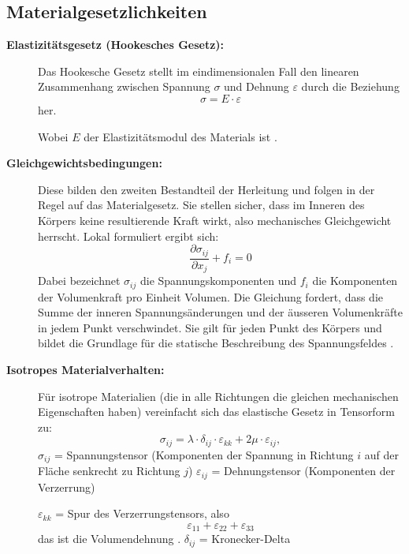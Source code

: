 \subsection{Materialgesetzlichkeiten}
\begin{description}	
	\item[\textbf{Elastizitätsgesetz (Hookesches Gesetz):}] Das Hookesche Gesetz stellt im eindimensionalen Fall den linearen Zusammenhang zwischen Spannung $\sigma$ und Dehnung $\varepsilon$ durch die Beziehung 
	\begin{equation}
		\sigma = 
		E \cdot \varepsilon
	\end{equation}
	 her.
	 
	 Wobei $E$ der Elastizitätsmodul des Materials ist \cite{elastomechanik:Kontinuumsmechanik}.
	 \item[\textbf{Gleichgewichtsbedingungen:}] Diese bilden den zweiten Bestandteil der Herleitung und folgen in der Regel auf das Materialgesetz. 
	 Sie stellen sicher, dass im Inneren des Körpers keine resultierende Kraft wirkt, also mechanisches Gleichgewicht herrscht.
	 Lokal formuliert ergibt sich:
	 \begin{equation}
	 	\frac{\partial \sigma_{ij}}{\partial x_j} + f_i =
	 	0
	 \end{equation}
	 Dabei bezeichnet $\sigma_{ij}$ die Spannungskomponenten und $f_i$ die Komponenten der Volumenkraft pro Einheit Volumen. 
	 Die Gleichung fordert, dass die Summe der inneren Spannungsänderungen und der äusseren Volumenkräfte in jedem Punkt verschwindet. Sie gilt für jeden Punkt des Körpers und bildet die Grundlage für die statische Beschreibung des Spannungsfeldes \cite{elastomechanik:Grundlagen der Elastizitaetstheorie}.
	 \item[\textbf{Isotropes Materialverhalten:}] Für isotrope Materialien (die in alle Richtungen die gleichen mechanischen Eigenschaften haben) vereinfacht sich das elastische Gesetz in Tensorform zu:
	 \begin{equation}
	 	\sigma_{ij} = 
	 	\lambda \cdot \delta_{ij} \cdot \varepsilon_{kk} + 2\mu \cdot \varepsilon_{ij},
	 \end{equation}
	$\sigma_{ij}$ = Spannungstensor (Komponenten der Spannung in Richtung $i$ auf der Fläche senkrecht zu Richtung $j$)
	$\varepsilon_{ij}$ = Dehnungstensor (Komponenten der Verzerrung)
	
	$\varepsilon_{kk}$ = Spur des Verzerrungstensors, also
	\begin{equation}
		\varepsilon_{11} + \varepsilon_{22} + \varepsilon_{33}
	\end{equation}
	das ist die Volumendehnung \cite{elastomechanik:Grundlagen der Elastizitaetstheorie}.
	 $\delta_{ij}$ = Kronecker-Delta 
	 

\end{description}
